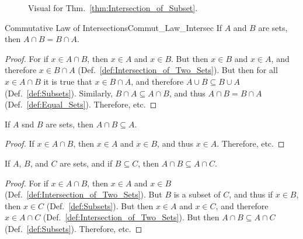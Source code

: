         \begin{figure}[H]
            \centering
            \captionsetup{type=figure}
            \centering
            
            \caption{Visual for Thm.~\ref{thm:Intersection_of_Subset}.}
            \label{fig:Union_Intersection_venn_diagram}
        \end{figure}
        \begin{ltheorem}{Commutative Law of Intersections}{Commut_Law_Intersec}
            If $A$ and $B$ are sets, then $A\cap{B}=B\cap{A}$.
        \end{ltheorem}
        \begin{proof}
            For if $x\in{A}\cap{B}$, then $x\in{A}$ and
            $x\in{B}$. But then $x\in{B}$ and $x\in{A}$,
            and therefore $x\in{B}\cap{A}$
            (Def.~\ref{def:Intersection_of_Two_Sets}). But then
            for all $x\in{A}\cap{B}$ it is true that
            $x\in{B}\cap{A}$, and therefore
            $A\cup{B}\subseteq{B}\cup{A}$
            (Def.~\ref{def:Subsets}). Similarly,
            $B\cap{A}\subseteq{A}\cap{B}$, and thus
            $A\cap{B}=B\cap{A}$ (Def.~\ref{def:Equal_Sets}).
            Therefore, etc.
        \end{proof}
        \begin{theorem}
            \label{thm:Intersection_is_Smaller}%
            If $A$ snd $B$ are sets, then
            $A\cap{B}\subseteq{A}$.
        \end{theorem}
        \begin{proof}
            If $x\in{A}\cap{B}$, then $x\in{A}$ and
            $x\in{B}$, and thus $x\in{A}$. Therefore, etc.
        \end{proof}
        \begin{theorem}
            \label{thm:Intersection_with_Lesser_Set}%
            If $A$, $B$, and $C$ are sets, and if
            $B\subseteq{C}$, then
            $A\cap{B}\subseteq{A}\cap{C}$.
        \end{theorem}
        \begin{proof}
            For if $x\in{A}\cap{B}$, then $x\in{A}$ and
            $x\in{B}$ (Def.~\ref{def:Intersection_of_Two_Sets}).
            But $B$ is a subset of $C$, and thus if
            $x\in{B}$, then $x\in{C}$
            (Def.~\ref{def:Subsets}). But then $x\in{A}$ and
            $x\in{C}$, and therefore $x\in{A}\cap{C}$
            (Def.~\ref{def:Intersection_of_Two_Sets}). But
            then $A\cap{B}\subseteq{A}\cap{C}$
            (Def.~\ref{def:Subsets}). Therefore, etc.
        \end{proof}
